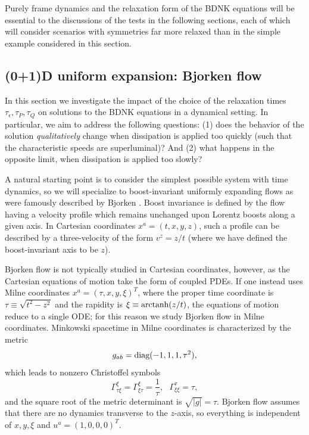 \documentclass[%
notitlepage,
superscriptaddress,
nofootinbib,
amsmath,
amssymb,
aps,
twocolumn
]{revtex4-1}
\begin{document}
Purely frame dynamics and the relaxation form of the BDNK equations will be
essential to the discussions of the tests in the following sections, each
of which will consider scenarios with symmetries far more relaxed than in
the simple example considered in this section.

\subsection{(0+1)D uniform expansion: Bjorken flow} \label{sec:Bjorken_flow}

In this section we investigate the impact of the choice of the relaxation times $\tau_{\epsilon}, \tau_{P}, \tau_{Q}$ on solutions to the BDNK equations in a dynamical setting.  In particular, we aim to address the following questions: (1) does the behavior of the solution \textit{qualitatively} change when dissipation is applied too quickly (such that the characteristic speeds are superluminal)? And (2) what happens in the opposite limit, when dissipation is applied too slowly?

A natural starting point is to consider the simplest possible system with time dynamics, so we will specialize to boost-invariant uniformly expanding flows as were famously described by Bjorken \cite{Bjorken1983}.  Boost invariance is defined by the flow having a velocity profile which remains unchanged upon Lorentz boosts along a given axis. In Cartesian coordinates $x^{a} = (t, x, y, z)$, such a profile can be described by a three-velocity of the form $v^{z} = z/t$ (where we have defined the boost-invariant axis to be $z$). 

Bjorken flow is not typically studied in Cartesian coordinates, however, as the Cartesian equations of motion take the form of coupled PDEs.  If one instead uses Milne coordinates $x^{a} = (\tau, x, y, \xi)^{T}$, where the proper time coordinate is $\tau \equiv \sqrt{t^2 - z^2}$ and the rapidity is $\xi \equiv \textnormal{arctanh}(z/t)$, the equations of motion reduce to a single ODE; for this reason we study Bjorken flow in Milne coordinates.  Minkowski spacetime in Milne coordinates is characterized by the metric
\begin{equation}
g_{ab} = \textnormal{diag}(-1, 1, 1, \tau^2),
\end{equation}
which leads to nonzero Christoffel symbols
\begin{equation}
\Gamma^{\xi}_{\tau \xi} = \Gamma^{\xi}_{\xi \tau} = \frac{1}{\tau}, ~~~ \Gamma^{\tau}_{\xi \xi} = \tau,
\end{equation}
and the square root of the metric determinant is ${\sqrt{|g|} = \tau}$.  Bjorken flow assumes that there are no dynamics transverse to the $z$-axis, so everything is independent of $x, y, \xi$ and $u^{a} = (1, 0, 0, 0)^{T}$.  
\end{document}
